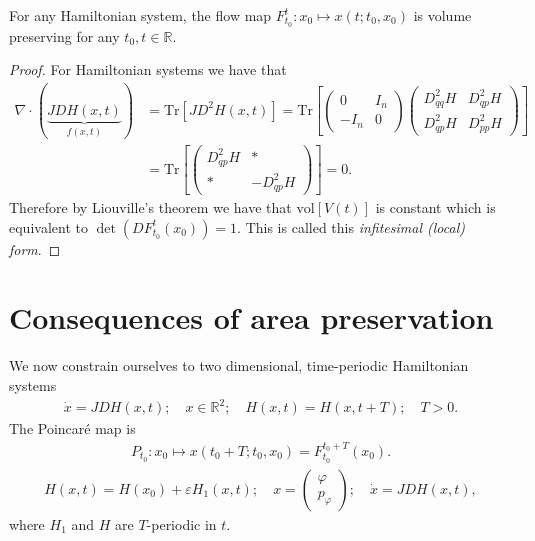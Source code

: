 \begin{proposition}
	For any Hamiltonian system, the flow map $F_{t_0}^{t}:x_0 \mapsto x(t;t_0,x_0)$ is volume preserving for any $t_0, t \in \mathbb{R}$. 
\end{proposition}
\begin{proof}
	For Hamiltonian systems we have that
	\begin{subequations}
	\begin{align}
		\nabla \cdot (\underbrace{JDH(x,t)}_{f(x,t)}) &=  \textrm{Tr} \left[ JD^2H(x,t) \right] =  \textrm{Tr} \left[
			\begin{pmatrix}
				0 & I_{n} \\
				-I_{n} & 0 
			\end{pmatrix}
			\begin{pmatrix}
				D^{2}_{qq}H & D^{2}_{qp}H \\
				D^{2}_{qp}H & D^{2}_{pp}H
			\end{pmatrix}
		\right]
	\\
	&= \textrm{Tr} \left[
			\begin{pmatrix}
				D^{2}_{qp}H& *\\
					 * & - D^{2}_{qp}H
		\end{pmatrix} \right]
			=0.
	\end{align}
	\end{subequations}
	Therefore by Liouville's theorem we have that $ \textrm{vol} [V(t)]$ is constant which is equivalent to $\det\left(DF_{t_0}^{t}(x_0)\right)=1$. This is called this \emph{infitesimal (local) form}.
\end{proof}

\section{Consequences of area preservation}
We now constrain ourselves to two dimensional, time-periodic Hamiltonian systems
\begin{align}
	\dot{x}= JDH(x,t);\quad x \in \mathbb{R}^{2};\quad H(x,t)= H(x,t+T);\quad T>0.
\end{align}
The Poincaré map is 
\begin{align}
	P_{t_0}:x_0 \mapsto x(t_0+T; t_0, x_0) = F_{t_0}^{t_0+T}(x_0).
\end{align}
\begin{align}
	H(x,t) = H(x_0) + \varepsilon H_{1}(x,t);\quad x = 
	\begin{pmatrix}
		\varphi \\ p_\varphi
	\end{pmatrix};\quad
	\dot{x} = JDH(x,t),
\end{align}
where $H_1$ and $H$ are $T$-periodic in $t$.

